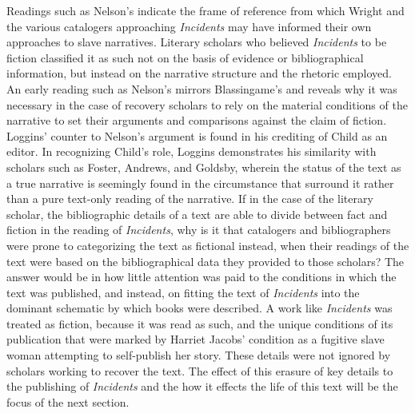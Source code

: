 Readings such as Nelson's indicate the frame of reference from which Wright and the various catalogers approaching \textit{Incidents} may have informed their own approaches to slave narratives. Literary scholars who believed \textit{Incidents} to be fiction classified it as such not on the basis of evidence or bibliographical information, but instead on the narrative structure and the rhetoric employed. An early reading such as Nelson's mirrors Blassingame's and reveals why it was necessary in the case of recovery scholars to rely on the material conditions of the narrative to set their arguments and comparisons against the claim of fiction. Loggins' counter to Nelson's argument is found in his crediting of Child as an editor. In recognizing Child's role, Loggins demonstrates his similarity with scholars such as Foster, Andrews, and Goldsby, wherein the status of the text as a true narrative is seemingly found in the circumstance that surround it rather than a pure text-only reading of the narrative. If in the case of the literary scholar, the bibliographic details of a text are able to divide between fact and fiction in the reading of \textit{Incidents}, why is it that catalogers and bibliographers were prone to categorizing the text as fictional instead, when their readings of the text were based on the bibliographical data they provided to those scholars? The answer would be in how little attention was paid to the conditions in which the text was published, and instead, on fitting the text of \textit{Incidents} into the dominant schematic by which books were described. A work like \textit{Incidents} was treated as fiction, because it was read as such, and the unique conditions of its publication that were marked by Harriet Jacobs' condition as a fugitive slave woman attempting to self-publish her story. These details were not ignored by scholars working to recover the text. The effect of this erasure of key details to the publishing of \textit{Incidents} and the how it effects the life of this text will be the focus of the next section. 


